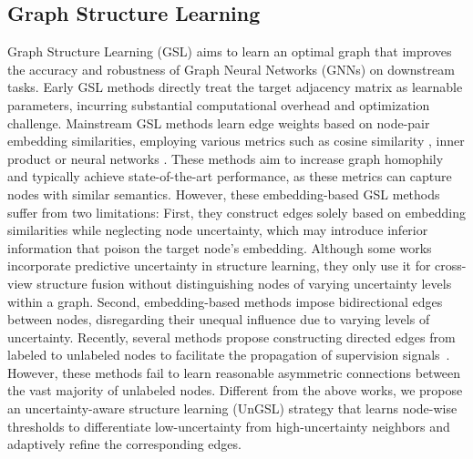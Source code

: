 \subsection{Graph Structure Learning}
Graph Structure Learning (GSL) aims to learn an optimal graph that improves the accuracy and robustness of Graph Neural Networks (GNNs) on downstream tasks.
Early GSL methods \cite{franceschi2019learning,jin2020graph} directly treat the target adjacency matrix as learnable parameters, incurring substantial
computational overhead and optimization challenge.
Mainstream GSL methods \cite{chen2020iterative,yu2021graph,wang2023prose,in2024self} learn edge weights based on node-pair embedding similarities, employing various metrics such as cosine similarity \cite{wang2023prose,in2024self}, inner product \cite{yu2021graph} or neural networks \cite{liu2022compact}.
These methods aim to increase graph homophily and typically achieve state-of-the-art performance, as these metrics can capture nodes with similar semantics.
However, these embedding-based GSL methods suffer from two limitations:
First, they construct edges solely based on embedding similarities while neglecting node uncertainty, which may introduce inferior information that poison the target node's embedding. 
Although some works~\cite{liu2022compact, duan2024structural} incorporate predictive uncertainty in structure learning, they only use it for cross-view structure fusion without distinguishing nodes of varying uncertainty levels within a graph.
Second, embedding-based methods impose bidirectional edges between nodes, disregarding their unequal influence due to varying levels of uncertainty.
Recently, several methods propose constructing directed edges from labeled to unlabeled nodes to facilitate the propagation of supervision signals~\cite{song2022towards,song2024optimal,lu2024latent}.
However, these methods fail to learn reasonable
asymmetric connections between the vast majority of unlabeled nodes.
Different from the above works, we propose an uncertainty-aware structure learning (UnGSL) strategy that learns node-wise thresholds to differentiate low-uncertainty from high-uncertainty neighbors and adaptively refine the corresponding edges.

